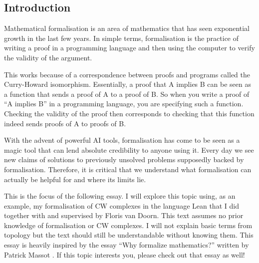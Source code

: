 



\subsection*{Introduction}

Mathematical formalisation is an area of mathematics that has seen exponential growth in the last few years. In simple terms, formalisation is the practice of writing a proof in a programming language and then using the computer to verify the validity of the argument. 

This works because of a correspondence between proofs and programs called the Curry-Howard isomorphism. Essentially, a proof that A implies B can be seen as a function that sends a proof of A to a proof of B. So when you write a proof of ``A implies B'' in a programming language, you are specifying such a function. Checking the validity of the proof then corresponds to checking that this function indeed sends proofs of A to proofs of B.

With the advent of powerful AI tools, formalisation has come to be seen as a magic tool that can lend absolute credibility to anyone using it. Every day we see new claims of solutions to previously unsolved problems supposedly backed by formalisation. Therefore, it is critical that we understand what formalisation can actually be helpful for and where its limits lie. 

This is the focus of the following essay. I will explore this topic using, as an example, my formalisation of CW complexes in the language Lean that I did together with and supervised by Floris van Doorn. This text assumes no prior knowledge of formalisation or CW complexes. I will not explain basic terms from topology but the text should still be understandable without knowing them. This essay is heavily inspired by the essay ``Why formalize mathematics?'' written by Patrick Massot \cite{Massot2021WhyFM}. If this topic interests you, please check out that essay as well!

